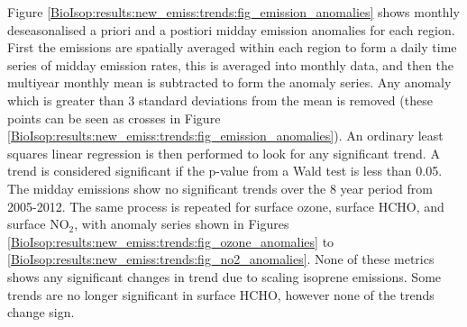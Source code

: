      Figure \ref{BioIsop:results:new_emiss:trends:fig_emission_anomalies} shows monthly deseasonalised a priori and a postiori midday emission anomalies for each region.
      First the emissions are spatially averaged within each region to form a daily time series of midday emission rates, this is averaged into monthly data, and then the multiyear monthly mean is subtracted to form the anomaly series.
      Any anomaly which is greater than 3 standard deviations from the mean is removed (these points can be seen as crosses in Figure \ref{BioIsop:results:new_emiss:trends:fig_emission_anomalies}).
      An ordinary least squares linear regression is then performed to look for any significant trend.
      A trend is considered significant if the p-value from a Wald test is less than 0.05.
      The midday emissions show no significant trends over the 8 year period from 2005-2012.
      The same process is repeated for surface ozone, surface HCHO, and surface NO$_2$, with anomaly series shown in Figures \ref{BioIsop:results:new_emiss:trends:fig_ozone_anomalies} to \ref{BioIsop:results:new_emiss:trends:fig_no2_anomalies}.
      None of these metrics shows any significant changes in trend due to scaling isoprene emissions.
      Some trends are no longer significant in surface HCHO, however none of the trends change sign.
      
      
      
      
      
